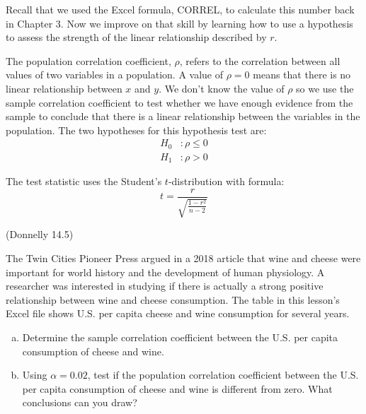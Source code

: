 \documentclass[12pt, letterpaper]{article}
\newcounter{exercise}
\theoremstyle{definition}
\begin{document}
\noindent Recall that we used the Excel formula, CORREL, to calculate this number back in Chapter 3.  Now we improve on that skill by learning how to use a hypothesis to assess the strength of the linear relationship described by $r$.

\vspace*{.1in}

\noindent The population correlation coefficient, $\rho$, refers to the correlation between all values of two variables in a population.  A value of $\rho =0$ means that there is no linear relationship between $x$ and $y$.  We don't know the value of $\rho$ so we use the sample correlation coefficient to test whether we have enough evidence from the sample to conclude that there is a linear relationship between the variables in the population.  The two hypotheses for this hypothesis test are:
\begin{align*}
H_0 &: \rho\leq 0\\
H_1 &: \rho>0
\end{align*}

\noindent The test statistic uses the Student's $t$-distribution with formula:
$$ t = \frac{r}{\sqrt{\frac{1-r^2}{n-2}}} $$


\newpage


\begin{exercise}  (Donnelly 14.5)

The Twin Cities Pioneer Press argued in a 2018 article that wine and cheese were important for world history and the development of human physiology.  A researcher was interested in studying if there is actually a strong positive relationship between wine and cheese consumption.  The table in this lesson's Excel file shows U.S. per capita cheese and wine consumption for several years.

\end{exercise}


\begin{enumerate}[(a)]

\item Determine the sample correlation coefficient between the U.S. per capita consumption of cheese and wine.

\vfill

\item Using $\alpha = 0.02$, test if the population correlation coefficient between the U.S. per capita consumption of cheese and wine is different from zero.  What conclusions can you draw?

\vfill

\end{enumerate}
\end{document}
